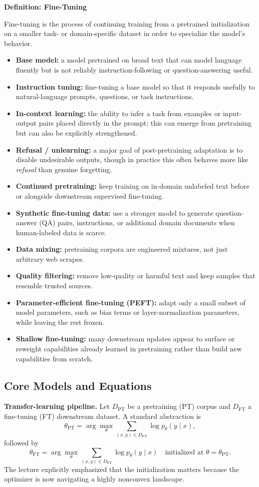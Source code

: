 \documentclass[11pt]{article}
\begin{document}
\textbf{Definition: Fine-Tuning}

Fine-tuning is the process of continuing training from a pretrained initialization on a smaller task- or domain-specific dataset in order to specialize the model's behavior.

\begin{itemize}
    \item \textbf{Base model:} a model pretrained on broad text that can model language fluently but is not reliably instruction-following or question-answering useful.
    \item \textbf{Instruction tuning:} fine-tuning a base model so that it responds usefully to natural-language prompts, questions, or task instructions.
    \item \textbf{In-context learning:} the ability to infer a task from examples or input-output pairs placed directly in the prompt; this can emerge from pretraining but can also be explicitly strengthened.
    \item \textbf{Refusal / unlearning:} a major goal of post-pretraining adaptation is to disable undesirable outputs, though in practice this often behaves more like \emph{refusal} than genuine forgetting.
    \item \textbf{Continued pretraining:} keep training on in-domain unlabeled text before or alongside downstream supervised fine-tuning.
    \item \textbf{Synthetic fine-tuning data:} use a stronger model to generate question-answer (QA) pairs, instructions, or additional domain documents when human-labeled data is scarce.
    \item \textbf{Data mixing:} pretraining corpora are engineered mixtures, not just arbitrary web scrapes.
    \item \textbf{Quality filtering:} remove low-quality or harmful text and keep samples that resemble trusted sources.
    \item \textbf{Parameter-efficient fine-tuning (PEFT):} adapt only a small subset of model parameters, such as bias terms or layer-normalization parameters, while leaving the rest frozen.
    \item \textbf{Shallow fine-tuning:} many downstream updates appear to surface or reweight capabilities already learned in pretraining rather than build new capabilities from scratch.
\end{itemize}

\subsection{Core Models and Equations}
\textbf{Transfer-learning pipeline.} Let \(D_{\mathrm{PT}}\) be a pretraining (PT) corpus and \(D_{\mathrm{FT}}\) a fine-tuning (FT) downstream dataset. A standard abstraction is
\[
\theta_{\mathrm{PT}}
=
\arg\max_{\theta}\sum_{(x,y)\in D_{\mathrm{PT}}}\log p_{\theta}(y \mid x),
\]
followed by
\[
\theta_{\mathrm{FT}}
=
\arg\max_{\theta}\sum_{(x,y)\in D_{\mathrm{FT}}}\log p_{\theta}(y \mid x)
\quad\text{initialized at } \theta=\theta_{\mathrm{PT}}.
\]
The lecture explicitly emphasized that the initialization matters because the optimizer is now navigating a highly nonconvex landscape.
\end{document}

